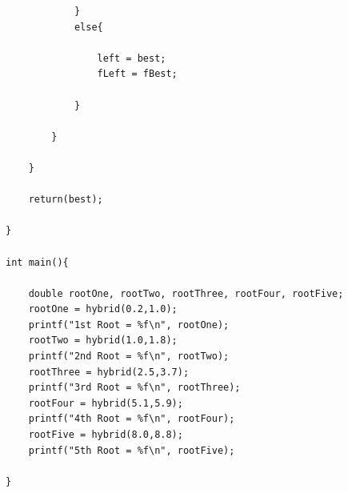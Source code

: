 \documentclass[12pt]{article}
\begin{document}
\begin{verbatim}
			}
			else{

				left = best;
				fLeft = fBest;

			}

		}

	}

	return(best);

}

int main(){

	double rootOne, rootTwo, rootThree, rootFour, rootFive;
	rootOne = hybrid(0.2,1.0);
	printf("1st Root = %f\n", rootOne);
	rootTwo = hybrid(1.0,1.8);
	printf("2nd Root = %f\n", rootTwo);
	rootThree = hybrid(2.5,3.7);
	printf("3rd Root = %f\n", rootThree);
	rootFour = hybrid(5.1,5.9);
	printf("4th Root = %f\n", rootFour);
	rootFive = hybrid(8.0,8.8);
	printf("5th Root = %f\n", rootFive);

}
\end{verbatim}
\end{document}
